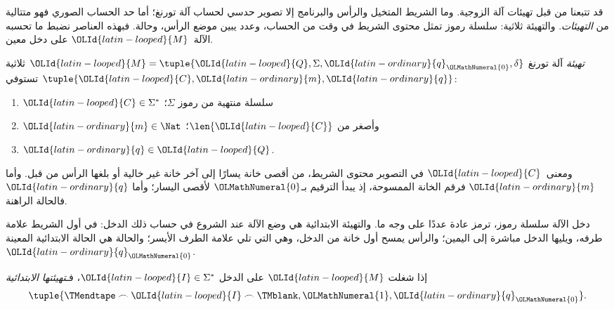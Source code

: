 \documentclass[../../../include/open-logic-section]{subfiles}
\begin{document}

\begin{explain}
قد تتبعنا من قبل تهيئات آلة الزوجية. وما الشريط المتخيل والرأس والبرنامج إلا تصوير حدسي لحساب آلة تورنغ؛ أما حد الحساب الصوري فهو متتالية من \emph{التهيئات}. والتهيئة ثلاثية: سلسلة رموز تمثل محتوى الشريط في وقت من الحساب، وعدد يبين موضع الرأس، وحالة. فبهذه العناصر نضبط ما تحسبه الآلة~${\OLId{latin-looped}{M}}$ على دخل معين.
\end{explain}

\begin{defn}[التهيئة]
\emph{تهيئة} آلة تورنغ ${\OLId{latin-looped}{M}}=\tuple{{\OLId{latin-looped}{Q}},\Sigma,{\OLId{latin-ordinary}{q}}_{\OLMathNumeral{0}},\delta}$ ثلاثية $\tuple{{\OLId{latin-looped}{C}},{\OLId{latin-ordinary}{m}},{\OLId{latin-ordinary}{q}}}$ تستوفي:
\begin{enumerate}
\item ${\OLId{latin-looped}{C}} \in \Sigma^*$ سلسلة منتهية من رموز $\Sigma$؛
\item ${\OLId{latin-ordinary}{m}} \in \Nat$ وأصغر من $\len{{\OLId{latin-looped}{C}}}$؛
\item ${\OLId{latin-ordinary}{q}} \in {\OLId{latin-looped}{Q}}$.
\end{enumerate}
ومعنى~${\OLId{latin-looped}{C}}$ في التصوير محتوى الشريط، من أقصى خانة يسارًا إلى آخر خانة غير خالية أو بلغها الرأس من قبل. وأما ${\OLId{latin-ordinary}{m}}$ فرقم الخانة الممسوحة، إذ يبدأ الترقيم بـ${\OLMathNumeral{0}}$ لأقصى اليسار؛ وأما ${\OLId{latin-ordinary}{q}}$ فالحالة الراهنة.
\end{defn}

\begin{explain}
دخل الآلة سلسلة رموز، ترمز عادة عددًا على وجه ما. والتهيئة الابتدائية هي وضع الآلة عند الشروع في حساب ذلك الدخل: في أول الشريط علامة طرفه، ويليها الدخل مباشرة إلى اليمين؛ والرأس يمسح أول خانة من الدخل، وهي التي تلي علامة الطرف الأيسر؛ والحالة هي الحالة الابتدائية المعينة~${\OLId{latin-ordinary}{q}}_{\OLMathNumeral{0}}$.
\end{explain}

\begin{defn}
إذا شغلت ${\OLId{latin-looped}{M}}$ على الدخل ${\OLId{latin-looped}{I}} \in \Sigma^*$، فـ\emph{تهيئتها الابتدائية}
\[
\tuple{\TMendtape \frown {\OLId{latin-looped}{I}} \frown \TMblank, {\OLMathNumeral{1}}, {\OLId{latin-ordinary}{q}}_{\OLMathNumeral{0}}}.
\]
\end{defn}
\end{document}
